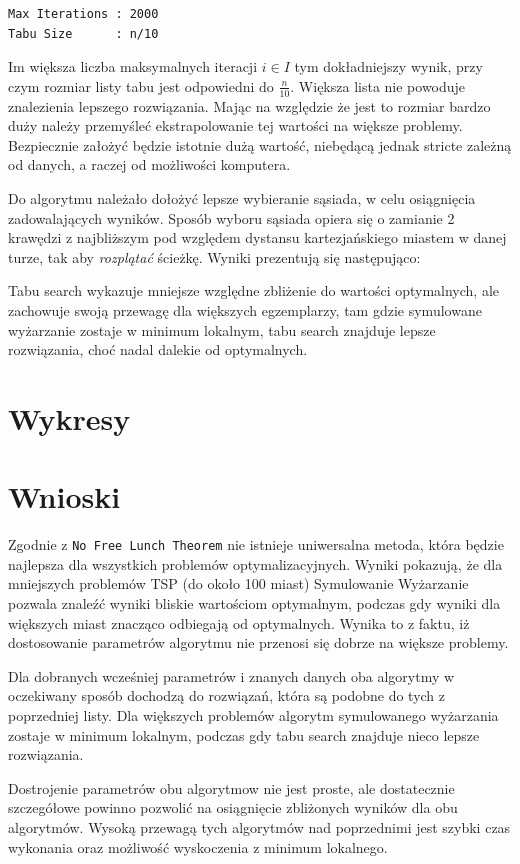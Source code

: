 \documentclass{article}
\begin{document}
\begin{verbatim}
Max Iterations : 2000
Tabu Size      : n/10
\end{verbatim}

Im większa liczba maksymalnych iteracji $i\in I$ tym dokładniejszy wynik,
przy czym rozmiar listy tabu jest odpowiedni do $\frac{n}{10}$. Większa lista nie powoduje znalezienia lepszego rozwiązania.
Mając na względzie że jest to rozmiar bardzo duży należy przemyśleć ekstrapolowanie tej wartości na większe problemy.
Bezpiecznie założyć będzie istotnie dużą wartość, niebędącą jednak stricte zależną od danych, a raczej od możliwości komputera.

\noindent
Do algorytmu należało dołożyć lepsze wybieranie sąsiada, w celu osiągnięcia zadowalających wyników.
Sposób wyboru sąsiada opiera się o zamianie 2 krawędzi z najbliższym pod względem dystansu kartezjańskiego miastem w danej turze,
tak aby \textit{rozplątać} ścieżkę. Wyniki prezentują się następująco:



Tabu search wykazuje mniejsze względne zbliżenie do wartości optymalnych, ale zachowuje swoją przewagę
dla większych egzemplarzy, tam gdzie symulowane wyżarzanie zostaje w minimum lokalnym, tabu search znajduje
lepsze rozwiązania, choć nadal dalekie od optymalnych.

\section{Wykresy}



\section{Wnioski}

Zgodnie z \texttt{No Free Lunch Theorem} nie istnieje uniwersalna metoda, która będzie najlepsza dla wszystkich problemów optymalizacyjnych.
Wyniki pokazują, że dla mniejszych problemów TSP (do około 100 miast) Symulowanie Wyżarzanie pozwala 
znaleźć wyniki bliskie wartościom optymalnym, podczas gdy wyniki dla większych miast znacząco odbiegają od optymalnych.
Wynika to z faktu, iż dostosowanie parametrów algorytmu nie przenosi się dobrze na większe problemy.

\noindent
Dla dobranych wcześniej parametrów i znanych danych oba algorytmy w oczekiwany sposób dochodzą do rozwiązań,
która są podobne do tych z poprzedniej listy. Dla większych problemów algorytm symulowanego wyżarzania zostaje w minimum lokalnym,
podczas gdy tabu search znajduje nieco lepsze rozwiązania. 

\noindent
Dostrojenie parametrów obu algorytmow nie jest proste, ale dostatecznie szczegółowe powinno pozwolić na osiągnięcie zbliżonych wyników 
dla obu algorytmów. Wysoką przewagą tych algorytmów nad poprzednimi jest szybki czas wykonania oraz
możliwość wyskoczenia z minimum lokalnego.
\end{document}
